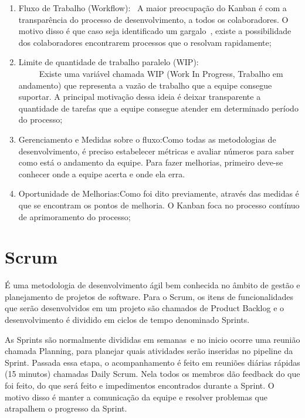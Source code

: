 \documentclass[
    12pt,               %
    openright,          %
    oneside,            %
    a4paper,            %
    section=TITLE,     %
    english,            %
    french,             %
    spanish,            %
    brazil              %
    ]{abntex2}
\newcommand{\citep}{\cite}
\begin{document}
\begin{enumerate}[start=1]
	
\item Fluxo de Trabalho (Workflow):~
	A maior preocupação do Kanban é com a transparência do processo de desenvolvimento, a todos os colaboradores. O motivo disso é que caso seja identificado um gargalo~, existe a possibilidade dos colaboradores encontrarem processos que o resolvam rapidamente;

	
	
\item Limite de quantidade de trabalho paralelo (WIP): ~ ~ ~ ~ ~ ~ ~ ~ ~ ~ ~ ~ ~ ~ ~ ~ ~ Existe uma variável chamada WIP (Work In Progress, Trabalho em andamento) que representa a vazão de trabalho que a equipe consegue suportar. A principal motivação dessa ideia é deixar transparente a quantidade de tarefas que a equipe consegue atender em determinado período do processo;
	
\item Gerenciamento e Medidas sobre o fluxo:Como todas as metodologias de desenvolvimento, é preciso estabelecer métricas e avaliar números para saber como está o andamento da equipe. Para fazer melhorias, primeiro deve-se conhecer onde a equipe acerta e onde ela erra.
	
\item Oportunidade de Melhorias:Como foi dito previamente, através das medidas é que se encontram os pontos de melhoria. O Kanban foca no processo contínuo de aprimoramento do processo;

\end{enumerate}


\section{Scrum}

É uma metodologia de desenvolvimento ágil bem conhecida no âmbito de gestão e planejamento de projetos de software. Para o Scrum, os itens de funcionalidades que serão desenvolvidos em um projeto são chamados de Product Backlog e o desenvolvimento é dividido em ciclos de tempo denominado Sprints.\citep{62123}


As Sprints são normalmente divididas em semanas~e no inicio ocorre uma reunião chamada Planning, para planejar quais atividades serão inseridas no pipeline da Sprint. Passada essa etapa, o acompanhamento é feito em reuniões diárias rápidas (15 minutos) chamadas Daily Scrum. Nela todos os membros dão feedback do que foi feito, do que será feito e impedimentos encontrados durante a Sprint. O motivo disso é manter a comunicação da equipe e resolver problemas que atrapalhem o progresso da Sprint.
\end{document}
